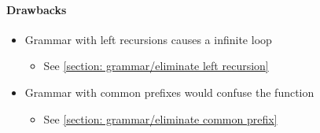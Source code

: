   \paragraph{Drawbacks}
  \begin{itemize}
    \item Grammar with left recursions causes a infinite loop
    \begin{itemize}
      \item See \ref{section: grammar/eliminate left recursion}
    \end{itemize}
    \item Grammar with common prefixes would confuse the function
    \begin{itemize}
      \item See \ref{section: grammar/eliminate common prefix}
    \end{itemize}
  \end{itemize}
